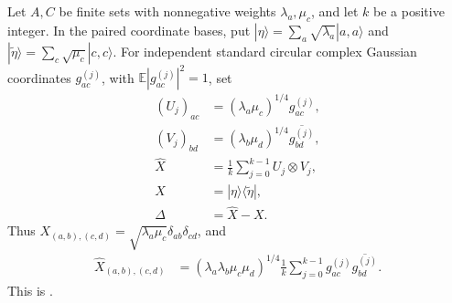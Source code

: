 \begin{definition}\label{def:source_product}
    \leanok
    Let $A,C$ be finite sets with nonnegative weights $\lambda_a,\mu_c$,
    and let $k$ be a positive integer. In the paired coordinate bases, put
    $|\eta\rangle=\sum_a\sqrt{\lambda_a}|a,a\rangle$ and
    $|\widetilde\eta\rangle=\sum_c\sqrt{\mu_c}|c,c\rangle$.
    For independent standard circular complex Gaussian coordinates
    $g^{(j)}_{ac}$, with $\mathbb E|g^{(j)}_{ac}|^2=1$, set
    \begin{align}
        (U_j)_{ac} & =(\lambda_a\mu_c)^{1/4}g^{(j)}_{ac},
        \label{eq:source_u}                                          \\
        (V_j)_{bd} & =(\lambda_b\mu_d)^{1/4}\overline{g^{(j)}_{bd}},
        \label{eq:source_v}                                          \\
        \widehat X & =\frac1k\sum_{j=0}^{k-1}U_j\otimes V_j,
        \label{eq:source_sampled}                                    \\
        X          & =|\eta\rangle\langle\widetilde\eta|,
        \label{eq:source_target}                                     \\
        \Delta     & =\widehat X-X.
        \label{eq:source_correction}
    \end{align}
    Thus $X_{(a,b),(c,d)}=\sqrt{\lambda_a\mu_c}\delta_{ab}\delta_{cd}$,
    and
    \begin{align}
        \widehat X_{(a,b),(c,d)}
         & =(\lambda_a\lambda_b\mu_c\mu_d)^{1/4}
        \frac1k\sum_{j=0}^{k-1}g^{(j)}_{ac}\overline{g^{(j)}_{bd}}.
        \label{eq:source_sampled_entry}
    \end{align}
    This is \cite[Equation~(5.6)]{OpenAI2026PolynomialPEPS}.
\end{definition}

